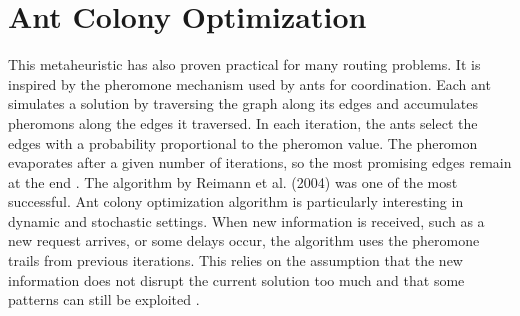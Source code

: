 \section{Ant Colony Optimization}
This metaheuristic has also proven practical for many routing problems. It is inspired by the pheromone mechanism used by ants for coordination. Each ant simulates a solution by traversing the graph along its edges and accumulates pheromons along the edges it traversed. In each iteration, the ants select the edges with a probability proportional to the pheromon value. The pheromon evaporates after a given number of iterations, so the most promising edges remain at the end \cite{Bono2020, Solnon2010}. The algorithm by Reimann et al. (2004) \cite{Reimann2004} was one of the most successful.
Ant colony optimization algorithm is particularly interesting in dynamic and stochastic settings. When new information is received, such as a new request arrives, or some delays occur, the algorithm uses the pheromone trails from previous iterations. This relies on the assumption that the new information does not disrupt the current solution too much and that some patterns can still be exploited \cite{Schyns2015, Bono2020}.